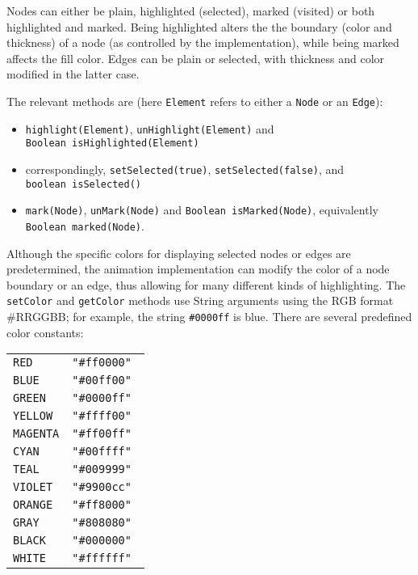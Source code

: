 Nodes can either be plain, highlighted (selected), marked (visited) or both highlighted and
marked.
Being highlighted alters the
the boundary (color and thickness) of a node (as controlled by the
implementation), while being marked affects the fill color.
Edges can be plain or selected, with thickness and color modified in the
latter case.

The relevant methods are
(here \texttt{Element} refers to either a \texttt{Node} or an \texttt{Edge}):
\begin{itemize}
\item \texttt{highlight(Element)}, \texttt{unHighlight(Element)}
  and \texttt{Boolean~isHighlighted(Element)}
\item correspondingly, \texttt{setSelected(true)}, \texttt{setSelected(false)},
and \texttt{boolean~isSelected()}
\item \texttt{mark(Node)}, \texttt{unMark(Node)}
  and \texttt{Boolean~isMarked(Node)},
  equivalently \texttt{Boolean~marked(Node)}.
\end{itemize}

Although the specific colors for displaying selected nodes or edges are
predetermined, the animation implementation can modify the color of a node boundary
or an edge, thus allowing for many different kinds of highlighting.
The \texttt{setColor} and \texttt{getColor} methods use String arguments
using the RGB format \textsf{\#RRGGBB}; for example,
the string \texttt{\#0000ff} is blue.
There are several predefined color constants:

\begin{tabular}{l @{~} l}
\texttt{RED} & \texttt{"\#ff0000"} \\
\texttt{BLUE} & \texttt{"\#00ff00"} \\
\texttt{GREEN} & \texttt{"\#0000ff"} \\
\texttt{YELLOW} & \texttt{"\#ffff00"} \\
\texttt{MAGENTA} & \texttt{"\#ff00ff" } \\
\texttt{CYAN} & \texttt{"\#00ffff"} \\
\texttt{TEAL} & \texttt{"\#009999"} \\
\texttt{VIOLET} & \texttt{"\#9900cc"} \\
\texttt{ORANGE} & \texttt{"\#ff8000"} \\
\texttt{GRAY} & \texttt{"\#808080"} \\
\texttt{BLACK} & \texttt{"\#000000"} \\
\texttt{WHITE} & \texttt{"\#ffffff"}
\end{tabular}

